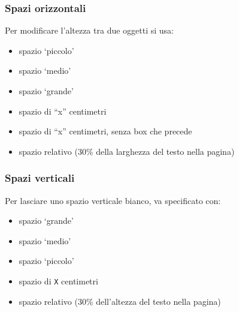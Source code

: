 \documentclass[svgnames,%
	ucs,%
	pdftex]{guitbeamer}
\begin{document}
\begin{frame}
  \frametitle{Spazi orizzontali}
	Per modificare l'altezza tra due oggetti si usa:
	\begin{itemize}
		\item{} spazio `piccolo'
		\item{} spazio `medio'
		\item{} spazio `grande'
		\item{} spazio di ``x'' centimetri
		\item{} spazio di ``x'' centimetri, senza box che precede
		\item{} spazio relativo (30\% della larghezza del testo nella pagina)
	\end{itemize}
\end{frame}
\begin{frame}
  \frametitle{Spazi verticali}
	Per lasciare uno spazio verticale bianco, va specificato con:
	\begin{itemize}
		\item{} spazio `grande'
		\item{} spazio `medio'
		\item{} spazio `piccolo'
		\item{} spazio di \texttt{X} centimetri
		\item{} spazio relativo (30\% dell'altezza del testo nella pagina)
	\end{itemize}
\end{frame}
\end{document}
